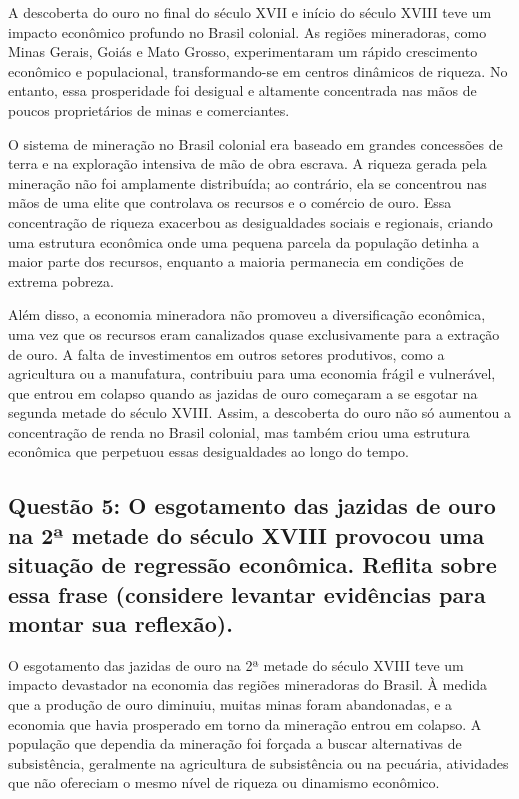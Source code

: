 \documentclass[a4paper,12pt]{article}[abntex2]
\begin{document}
A descoberta do ouro no final do século XVII e início do século XVIII teve um impacto econômico profundo no Brasil colonial. As regiões mineradoras, como Minas Gerais, Goiás e Mato Grosso, experimentaram um rápido crescimento econômico e populacional, transformando-se em centros dinâmicos de riqueza. No entanto, essa prosperidade foi desigual e altamente concentrada nas mãos de poucos proprietários de minas e comerciantes.

O sistema de mineração no Brasil colonial era baseado em grandes concessões de terra e na exploração intensiva de mão de obra escrava. A riqueza gerada pela mineração não foi amplamente distribuída; ao contrário, ela se concentrou nas mãos de uma elite que controlava os recursos e o comércio de ouro. Essa concentração de riqueza exacerbou as desigualdades sociais e regionais, criando uma estrutura econômica onde uma pequena parcela da população detinha a maior parte dos recursos, enquanto a maioria permanecia em condições de extrema pobreza.

Além disso, a economia mineradora não promoveu a diversificação econômica, uma vez que os recursos eram canalizados quase exclusivamente para a extração de ouro. A falta de investimentos em outros setores produtivos, como a agricultura ou a manufatura, contribuiu para uma economia frágil e vulnerável, que entrou em colapso quando as jazidas de ouro começaram a se esgotar na segunda metade do século XVIII. Assim, a descoberta do ouro não só aumentou a concentração de renda no Brasil colonial, mas também criou uma estrutura econômica que perpetuou essas desigualdades ao longo do tempo.

\subsection{\textbf{Questão 5: O esgotamento das jazidas de ouro na 2ª metade do século XVIII provocou uma situação de regressão econômica. Reflita sobre essa frase (considere levantar evidências para montar sua reflexão).}}

O esgotamento das jazidas de ouro na 2ª metade do século XVIII teve um impacto devastador na economia das regiões mineradoras do Brasil. À medida que a produção de ouro diminuiu, muitas minas foram abandonadas, e a economia que havia prosperado em torno da mineração entrou em colapso. A população que dependia da mineração foi forçada a buscar alternativas de subsistência, geralmente na agricultura de subsistência ou na pecuária, atividades que não ofereciam o mesmo nível de riqueza ou dinamismo econômico.
\end{document}
